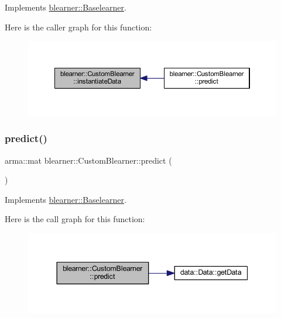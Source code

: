 Implements \mbox{\hyperlink{classblearner_1_1_baselearner_af01f1b8c4540927705ff79c3649489f7}{blearner\+::\+Baselearner}}.

Here is the caller graph for this function\+:
\nopagebreak
\begin{figure}[H]
\begin{center}
\leavevmode
\includegraphics[width=350pt]{classblearner_1_1_custom_blearner_a18971368219f6948456b8e60c20b6968_icgraph}
\end{center}
\end{figure}
\mbox{\label{classblearner_1_1_custom_blearner_a20b5fe06512aa73478b9f934e1c81c31}} 
\subsubsection{\texorpdfstring{predict()}{predict()}\hspace{0.1cm}{\footnotesize\ttfamily [1/2]}}
{\footnotesize\ttfamily arma\+::mat blearner\+::\+Custom\+Blearner\+::predict (\begin{DoxyParamCaption}{ }\end{DoxyParamCaption})\hspace{0.3cm}{\ttfamily [virtual]}}



Implements \mbox{\hyperlink{classblearner_1_1_baselearner_ab37986047db43c84420fef2cef7fc20d}{blearner\+::\+Baselearner}}.

Here is the call graph for this function\+:
\nopagebreak
\begin{figure}[H]
\begin{center}
\leavevmode
\includegraphics[width=344pt]{classblearner_1_1_custom_blearner_a20b5fe06512aa73478b9f934e1c81c31_cgraph}
\end{center}
\end{figure}
\mbox{\label{classblearner_1_1_custom_blearner_a401a479834eb3896260cb57b4551ceb4}} 
